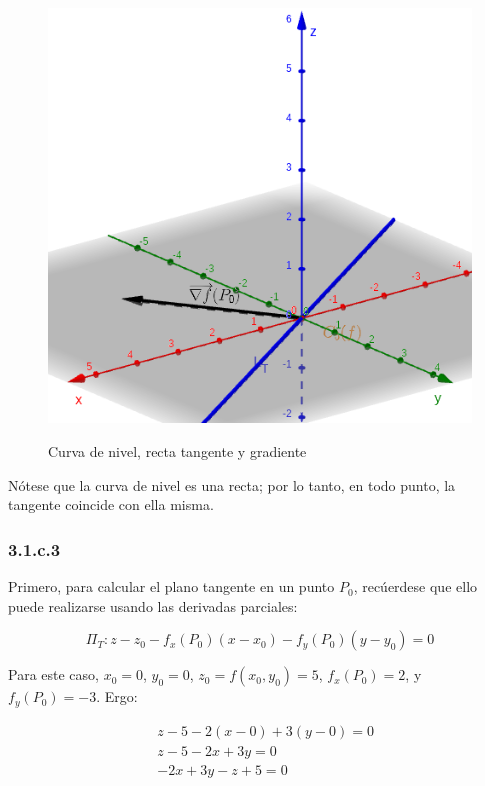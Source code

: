 \documentclass{article}
\begin{document}
\begin{figure}[ht]
\caption{Curva de nivel, recta tangente y gradiente}
\includegraphics[scale=0.35]{img/ejercicios/3/1-c-2.png} 
\centering
\label{fig:1-c-2}
\end{figure}

Nótese que la curva de nivel es una recta; por lo tanto, en todo punto, la tangente coincide con ella misma.

\subsubsection*{3.1.c.3}
\label{subsubsec:3.1.c.3}

Primero, para calcular el plano tangente en un punto $P_0$, recúerdese que ello puede realizarse usando las derivadas parciales:

\begin{equation}
\Pi_T: z-z_0 - f_x(P_0) (x-x_0) - f_y(P_0) (y-y_0) = 0
\end{equation}

Para este caso, $x_0 = 0$, $y_0 = 0$, $z_0 = f(x_0,y_0) = 5$, $f_x(P_0) = 2$, y $f_y(P_0) = -3$. Ergo:

\begin{subequations}
\begin{align}
& z-5 - 2 (x-0) + 3 (y-0) = 0 \\
& z-5 -2x +3y = 0 \\
& -2x +3y -z +5 = 0
\end{align}
\end{subequations}
\end{document}
